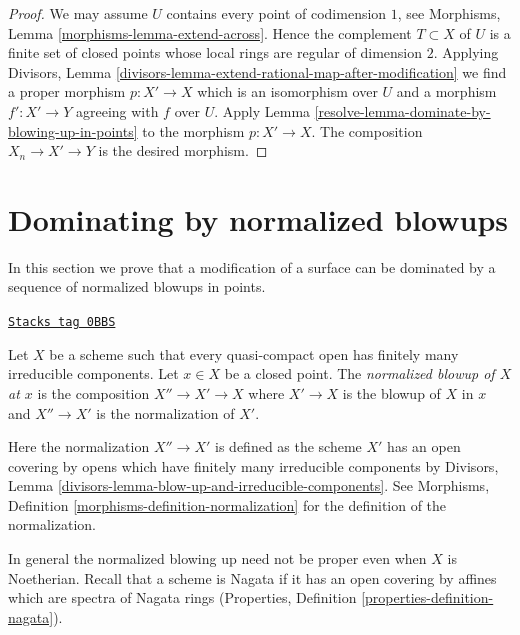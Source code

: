 \begin{proof}

We may assume $U$ contains every point of codimension $1$, see
Morphisms, Lemma \ref{morphisms-lemma-extend-across}.
Hence the complement $T \subset X$ of $U$ is a finite set
of closed points whose local rings are regular of dimension $2$.
Applying
Divisors, Lemma \ref{divisors-lemma-extend-rational-map-after-modification}
we find a proper morphism $p : X' \to X$ which is an isomorphism
over $U$ and a morphism $f' : X' \to Y$ agreeing with $f$ over $U$.
Apply Lemma \ref{resolve-lemma-dominate-by-blowing-up-in-points}
to the morphism $p : X' \to X$. The composition $X_n \to X' \to Y$ is
the desired morphism.
\end{proof}

\section{Dominating by normalized blowups}
\label{resolve-section-normalized-blowups}
In this section we prove that a modification of a surface can be dominated
by a sequence of normalized blowups in points.

\begin{definition}
\label{resolve-definition-normalized-blowup}
\href{https://stacks.math.columbia.edu/tag/0BBS}{\texttt{Stacks tag 0BBS}}

Let $X$ be a scheme such that every quasi-compact open has finitely
many irreducible components. Let $x \in X$ be a closed point.
The {\it normalized blowup of $X$ at $x$} is the composition
$X'' \to X' \to X$ where $X' \to X$ is the blowup
of $X$ in $x$ and $X'' \to X'$ is the normalization of $X'$.
\end{definition}

Here the normalization $X'' \to X'$ is defined as the scheme $X'$
has an open covering by opens which have finitely many irreducible
components by
Divisors, Lemma \ref{divisors-lemma-blow-up-and-irreducible-components}.
See Morphisms, Definition \ref{morphisms-definition-normalization}
for the definition of the normalization.

\medskip\noindent
In general the normalized blowing up need not be proper even
when $X$ is Noetherian. Recall that a scheme is Nagata if it
has an open covering by affines which are spectra of Nagata rings
(Properties, Definition \ref{properties-definition-nagata}).

